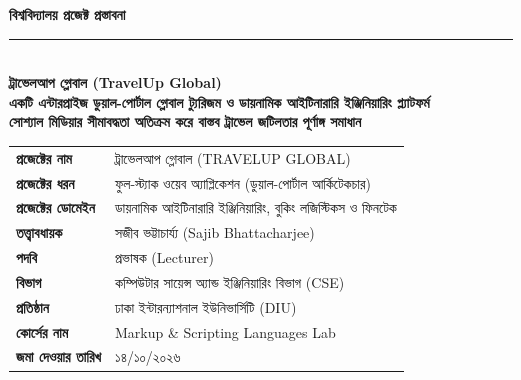 \documentclass[11pt,a4paper]{article}
\begin{document}
\begin{titlepage}
    \centering
    \vspace*{0.3cm}
    
    {\large\bfseries\textcolor{primary}{বিশ্ববিদ্যালয় প্রজেক্ট প্রস্তাবনা}}\\[0.2cm]
    {\color{primary}\rule{0.6\textwidth}{2.2pt}}\\[0.6cm]
    
    {\Huge \textbf{\textcolor{secondary}{ট্রাভেলআপ গ্লোবাল (TravelUp Global)}}}\\[0.3cm]
    {\large \textbf{একটি এন্টারপ্রাইজ ডুয়াল-পোর্টাল গ্লোবাল ট্যুরিজম ও ডায়নামিক আইটিনারারি ইঞ্জিনিয়ারিং প্ল্যাটফর্ম}}\\[0.2cm]
    {\normalsize \textbf{সোশ্যাল মিডিয়ার সীমাবদ্ধতা অতিক্রম করে বাস্তব ট্রাভেল জটিলতার পূর্ণাঙ্গ সমাধান}}\\[0.55cm]
    
    \renewcommand{\arraystretch}{1.22}
    \begin{tabularx}{\textwidth}{@{}>{\bfseries}p{5.2cm} X@{}}
        প্রজেক্টের নাম          & ট্রাভেলআপ গ্লোবাল (TRAVELUP GLOBAL) \\
        প্রজেক্টের ধরন          & ফুল-স্ট্যাক ওয়েব অ্যাপ্লিকেশন (ডুয়াল-পোর্টাল আর্কিটেকচার) \\
        প্রজেক্টের ডোমেইন        & ডায়নামিক আইটিনারারি ইঞ্জিনিয়ারিং, বুকিং লজিস্টিকস ও ফিনটেক \\
        তত্ত্বাবধায়ক            & সজীব ভট্টাচার্য্য (Sajib Bhattacharjee) \\
        পদবি                  & প্রভাষক (Lecturer) \\
        বিভাগ                 & কম্পিউটার সায়েন্স অ্যান্ড ইঞ্জিনিয়ারিং বিভাগ (CSE) \\
        প্রতিষ্ঠান             & ঢাকা ইন্টারন্যাশনাল ইউনিভার্সিটি (DIU) \\
        কোর্সের নাম           & Markup \& Scripting Languages Lab \\
        জমা দেওয়ার তারিখ      & ১৪/১০/২০২৬ \\
    \end{tabularx}
    
    \vspace{0.6cm}
    

\end{titlepage}
\end{document}
